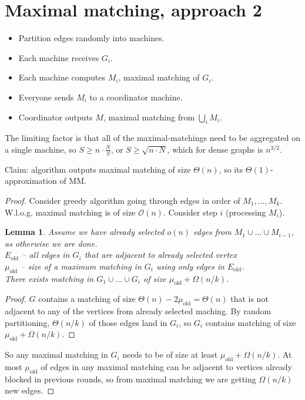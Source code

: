 \documentclass[11pt]{article}
\newtheorem{lemma}[theorem]{Lemma}
\newcommand{\bigo}{\mathcal{O}}
\begin{document}
\section{Maximal matching, approach 2}
\begin{itemize}
\item Partition edges randomly into machines. 
\item Each machine receives $G_i$.
\item Each machine computes $M_i$, maximal matching of $G_i$.
\item Everyone sends $M_i$ to a coordinator machine.
\item Coordinator outputs $M$, maximal matching from $\bigcup_i M_i$.
\end{itemize}

The limiting factor is that all of the maximal-matchings need to be aggregated on a single machine, so $S \ge n \cdot \frac{N}{S}$, or $S \ge \sqrt{n \cdot N}$, which for dense graphs is $n^{3/2}$.

Claim: algorithm outputs maximal matching of size $\Theta(n)$, so its $\Theta(1)$-approximation of MM.

\begin{proof}
Consider greedy algorithm going through edges in order of $M_1,\ldots,M_k$. W.l.o.g. maximal matching is of size $\bigo(n)$. Consider step $i$ (processing $M_i$). 

\begin{lemma}
Assume we have already selected $o(n)$ edges from $M_1 \cup \ldots \cup M_{i-1}$, as otherwise we are done.\\
$E_{\text{old}}$ -- all edges in $G_i$ that are adjacent to already selected vertex\\
$\mu_{\text{old}}$ -- size of a maximum matching in $G_i$ using only edges in $E_{\text{old}}$.\\
There exists matching in $G_1 \cup \ldots \cup G_{i}$ of size $\mu_{\text{old}} + \Omega(n/k)$.
\end{lemma}
\begin{proof}
$G$ contains a matching of size $\Theta(n) - 2 \mu_{\text{old}} = \Theta(n)$ that is not adjacent to any of the vertices from already selected maching. By random partitioning, $\Theta(n/k)$ of those edges land in $G_i$, so $G_i$ contains matching of size $\mu_{\text{old}} + \Omega(n/k)$.
\end{proof}


So any maximal matching in $G_i$ needs to be of size at least $\mu_{\text{old}} + \Omega(n/k)$. At most $\mu_{\text{old}}$ of edges in any maximal matching can be adjacent to vertices already blocked in previous rounds, so from maximal matching we are getting $\Omega(n/k)$ new edges.
\end{proof}



\end{document}
